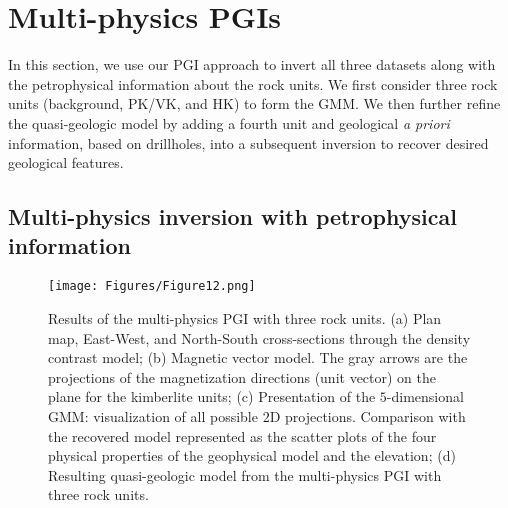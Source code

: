 \documentclass[paper, twocolumn]{geophysics} %
\begin{document}
\section{Multi-physics PGIs}

In this section, we use our PGI approach to invert all three datasets along with the petrophysical information about the rock units. We first consider three rock units (background, PK/VK, and HK) to form the GMM. We then further refine the quasi-geologic model by adding a fourth unit and geological \textit{a priori} information, based on drillholes, into a subsequent inversion to recover desired geological features.


\subsection{Multi-physics inversion with petrophysical information}



\begin{figure*}%
\centering
\texttt{[image: Figures/Figure12.png]}
\caption{Results of the multi-physics PGI with three rock units. (a) Plan map, East-West, and North-South cross-sections through the density contrast model; (b) Magnetic vector model. The gray arrows are the projections of the magnetization directions (unit vector) on the plane for the kimberlite units; (c) Presentation of the $5$-dimensional GMM: visualization of all possible $2$D projections. Comparison with the recovered model represented as the scatter plots of the four physical properties of the geophysical model and the elevation; (d) Resulting quasi-geologic model from the multi-physics PGI with three rock units.}
\label{fig:Figure12.png}
\end{figure*}%
\end{document}
